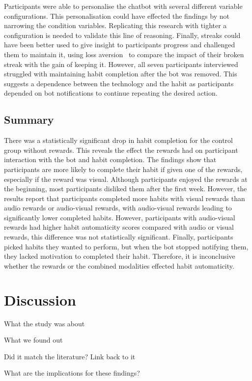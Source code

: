 \documentclass{scaffold/sigchi}
\begin{document}
Participants were able to personalise the chatbot with several different variable configurations. This personalisation could have effected the findings by not narrowing the condition variables. Replicating this research with tighter a configuration is needed to validate this line of reasoning. Finally, streaks could have been better used to give insight to participants progress and challenged them to maintain it, using loss aversion~\cite{loss_aversion} to compare the impact of their broken streak with the gain of keeping it. However, all seven participants interviewed struggled with maintaining habit completion after the bot was removed. This suggests a dependence between the technology and the habit as participants depended on bot notifications to continue repeating the desired action.

\subsection{Summary}
There was a statistically significant drop in habit completion for the control group without rewards. This reveals the effect the rewards had on participant interaction with the bot and habit completion. The findings show that participants are more likely to complete their habit if given one of the rewards, especially if the reward was visual. Although participants enjoyed the rewards at the beginning, most participants disliked them after the first week. However, the results report that participants completed more habits with visual rewards than audio rewards or audio-visual rewards, with audio-visual rewards leading to significantly lower completed habits. However, participants with audio-visual rewards had higher habit automaticity scores compared with audio or visual rewards, this difference was not statistically significant. Finally, participants picked habits they wanted to perform, but when the bot stopped notifying them, they lacked motivation to completed their habit. Therefore, it is inconclusive whether the rewards or the combined modalities effected habit automaticity. 

\section{Discussion}
What the study was about

What we found out

Did it match the literature? Link back to it

What are the implications for these findings?
\end{document}
